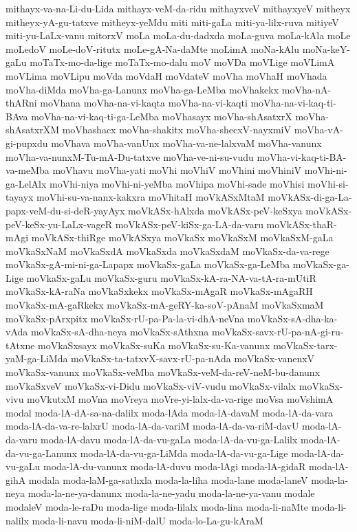 {mithayx-va-na-Li-du-Lida
mithayx-veM-da-ridu
mithayxveV
mithayxyeV
mitheyx
mitheyx-yA-gu-tatxve
mitheyx-yeMdu
miti
miti-gaLa
miti-ya-lilx-ruva
mitiyeV
miti-yu-LaLx-vanu
mitorxV
moLa
moLa-du-dadxda
moLa-guva
moLa-kAla
moLe
moLedoV
moLe-doV-ritutx
moLe-gA-Na-daMte
moLimA
moNa-kAlu
moNa-keY-gaLu
moTaTx-mo-da-lige
moTaTx-mo-dalu
moV
moVDa
moVLige
moVLimA
moVLima
moVLipu
moVda
moVdaH
moVdateV
moVha
moVhaH
moVhada
moVha-diMda
moVha-ga-Lanunx
moVha-ga-LeMba
moVhakekx
moVha-nA-thARni
moVhana
moVha-na-vi-kaqta
moVha-na-vi-kaqti
moVha-na-vi-kaq-ti-BAva
moVha-na-vi-kaq-ti-ga-LeMba
moVhasayx
moVha-shAsatxrX
moVha-shAsatxrXM
moVhashacx
moVha-shakitx
moVha-shecxV-nayxmiV
moVha-vA-gi-pupxdu
moVhava
moVha-vanUnx
moVha-va-ne-lalxvaM
moVha-vanunx
moVha-va-nunxM-Tu-mA-Du-tatxve
moVha-ve-ni-su-vudu
moVha-vi-kaq-ti-BA-va-meMba
moVhavu
moVha-yati
moVhi
moVhiV
moVhini
moVhiniV
moVhi-ni-ga-LelAlx
moVhi-niya
moVhi-ni-yeMba
moVhipa
moVhi-sade
moVhisi
moVhi-si-tayayx
moVhi-su-va-nanx-kakxra
moVhitaH
moVkASxMtaM
moVkASx-di-ga-La-papx-veM-du-si-deR-yayAyx
moVkASx-hAlxda
moVkASx-peV-keSxya
moVkASx-peV-keSx-yu-LaLx-vageR
moVkASx-peV-kiSx-ga-LA-da-varu
moVkASx-thaR-mAgi
moVkASx-thiRge
moVkASxya
moVkaSx
moVkaSxM
moVkaSxM-gaLa
moVkaSxNaM
moVkaSxdA
moVkaSxda
moVkaSxdaM
moVkaSx-da-va-rege
moVkaSx-gA-mi-ni-ga-Lapapx
moVkaSx-gaLa
moVkaSx-ga-LeMba
moVkaSx-ga-Lige
moVkaSx-gaLu
moVkaSx-guru
moVkaSx-kA-ra-NA-va-tA-ra-mUtiR
moVkaSx-kA-raNa
moVkaSxkekx
moVkaSx-mAgaR
moVkaSx-mAgaRH
moVkaSx-mA-gaRkekx
moVkaSx-mA-geRY-ka-soV-pAnaM
moVkaSxmaM
moVkaSx-pArxpitx
moVkaSx-rU-pa-Pa-la-vi-dhA-neVna
moVkaSx-sA-dha-ka-vAda
moVkaSx-sA-dha-neya
moVkaSx-sAthxna
moVkaSx-savx-rU-pa-nA-gi-ru-tAtxne
moVkaSxsayx
moVkaSx-suKa
moVkaSx-su-Ka-vanunx
moVkaSx-tarx-yaM-ga-LiMda
moVkaSx-ta-tatxvX-savx-rU-pa-nAda
moVkaSx-vanenxV
moVkaSx-vanunx
moVkaSx-veMba
moVkaSx-veM-da-reV-neM-bu-danunx
moVkaSxveV
moVkaSx-vi-Didu
moVkaSx-viV-vudu
moVkaSx-vilalx
moVkaSx-vivu
moVkutxM
moVna
moVreya
moVre-yi-lalx-da-va-rige
moVsa
moVshimA
modal
moda-lA-dA-sa-na-dalilx
moda-lAda
moda-lA-davaM
moda-lA-da-vara
moda-lA-da-va-re-lalxrU
moda-lA-da-variM
moda-lA-da-va-riM-davU
moda-lA-da-varu
moda-lA-davu
moda-lA-da-vu-gaLa
moda-lA-da-vu-ga-Lalilx
moda-lA-da-vu-ga-Lanunx
moda-lA-da-vu-ga-LiMda
moda-lA-da-vu-ga-Lige
moda-lA-da-vu-gaLu
moda-lA-du-vanunx
moda-lA-duvu
moda-lAgi
moda-lA-gidaR
moda-lA-gihA
modala
moda-laM-ga-sathxla
moda-la-liha
moda-lane
moda-laneV
moda-la-neya
moda-la-ne-ya-danunx
moda-la-ne-yadu
moda-la-ne-ya-vanu
modale
modaleV
moda-le-raDu
moda-lige
moda-lilalx
moda-lina
moda-li-naMte
moda-li-nalilx
moda-li-navu
moda-li-niM-dalU
moda-lo-La-gu-kAraM
}
